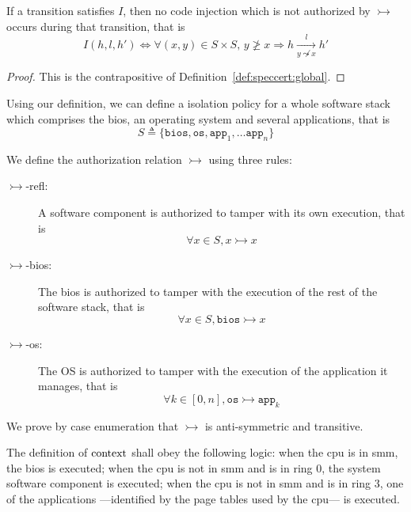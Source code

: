 \begin{corollary}
  If a transition satisfies $I$, then no code injection which is not authorized
  by $\rightarrowtail$ occurs during that transition, that is
  \[
    I(h, l, h') \iff \forall (x, y) \in S \times S \text{, } y \not\ge x
    \Rightarrow h \xrightarrow[y \not\leadsto x]{l} h'
  \]

  \begin{proof}
    This is the contrapositive of Definition~\ref{def:speccert:global}.
  \end{proof}
\end{corollary}

\begin{example}
  \label{example:speccert:ssisolation}
  Using our definition, we can define a isolation policy for a whole software
  stack which comprises the \ac{bios}, an operating system and several
  applications, that is
  \[
    S \triangleq \{ \mathtt{bios}, \mathtt{os}, \mathtt{app}_1, \dots
    \mathtt{app}_n \}
  \]

  We define the authorization relation $\rightarrowtail$ using three rules:
  \begin{description}
  \item [\(\rightarrowtail\)-refl:] A software component is authorized to tamper
    with its own execution, that is
    \[ \forall x \in S, x \rightarrowtail x \]
  \item [\(\rightarrowtail\)-bios:] The \ac{bios} is authorized to tamper with
    the execution of the rest of the software stack, that is
    \[ \forall x \in S, \mathtt{bios} \rightarrowtail x \]
  \item [\(\rightarrowtail\)-os:] The OS is authorized to tamper with the
    execution of the application it manages, that is
    \[ \forall k \in [0, n], \mathtt{os} \rightarrowtail \mathtt{app}_k \]
  \end{description}

  We prove by case enumeration that $\rightarrowtail$ is anti-symmetric and
  transitive.

  The definition of $\mathrm{context}$ shall obey the following logic: when the
  \ac{cpu} is in \ac{smm}, the \ac{bios} is executed; when the \ac{cpu} is not
  in \ac{smm} and is in ring 0, the system software component is executed; when
  the \ac{cpu} is not in \ac{smm} and is in ring 3, one of the applications
  ---identified by the page tables used by the \ac{cpu}--- is executed.
\end{example}

